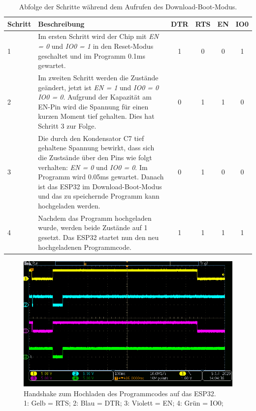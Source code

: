 \begin{table}[H]
\center
\begin{tabularx}{\textwidth}{|l|X||c|c||c|c|}
\hline
Schritt & Beschreibung & DTR & RTS & EN & IO0\\
\hline
1 & Im ersten Schritt wird der Chip mit \textit{EN = 0} und \textit{IO0 = 1} in den Reset-Modus geschaltet und im Programm 0.1ms gewartet. & 1 & 0 & 0 & 1 \\
\hline
2 & Im zweiten Schritt werden die Zustände geändert, jetzt ist \textit{EN = 1} und \textit{IO0 = 0} \textit{IO0 = 0}. Aufgrund der Kapazität am EN-Pin wird die Spannung für einen kurzen Moment tief gehalten. Dies hat Schritt 3 zur Folge. & 0 & 1 & 1 & 0 \\
\hline
3 & Die durch den Kondensator C7 tief gehaltene Spannung bewirkt, dass sich die Zustsände über den Pins wie folgt verhalten: \textit{EN = 0} und \textit{IO0 = 0}. Im Programm wird 0.05ms gewartet. Danach ist das ESP32 im Download-Boot-Modus und das zu speichernde Programm kann hochgeladen werden. & 0 & 1 & 0 & 0 \\
\hline
4 & Nachdem das Programm hochgeladen wurde, werden beide Zustände auf 1 gesetzt. Das ESP32 startet nun den neu hochgeladenen Programmcode. & 1 & 1 & 1 & 1 \\
\hline
\end{tabularx}
\caption{Abfolge der Schritte während dem Aufrufen des Download-Boot-Modus.}
\label{tab:Abfolge_Download_Boot_Modus}
\end{table}

\begin{figure}[H]
\center
\includegraphics[width = \textwidth]{graphics/ESP32_RTS_DTR_EN_IO0_gesamt}
\caption{Handshake zum Hochladen des Programmcodes auf das ESP32. \\\hspace{\textwidth}1: Gelb = RTS; 2: Blau = DTR; 3: Violett = EN; 4: Grün = IO0;}
\label{fig:ESP32_RTS_DTR_EN_IO0_gesamt}
\end{figure}


